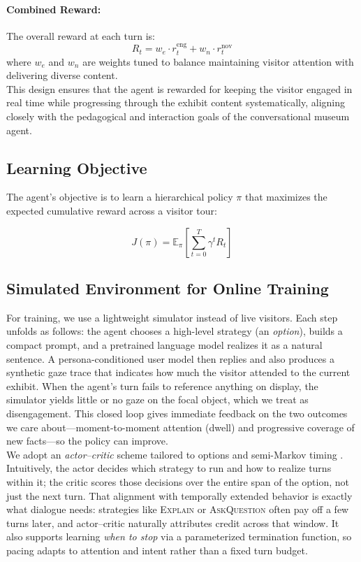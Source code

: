 \documentclass[12pt]{article}
\begin{document}
\paragraph{Combined Reward:}  
The overall reward at each turn is:
\[
R_t = w_e \cdot r^{\text{eng}}_t + w_n \cdot r^{\text{nov}}_t
\]
where $w_e$ and $w_n$ are weights tuned to balance maintaining visitor attention with delivering diverse content.\\

This design ensures that the agent is rewarded for keeping the visitor engaged in real time while progressing through the exhibit content systematically, aligning closely with the pedagogical and interaction goals of the conversational museum agent.


\subsection{Learning Objective}

The agent's objective is to learn a hierarchical policy \(\pi\) that maximizes the expected cumulative reward across a visitor tour:

\[
J(\pi) = \mathbb{E}_{\pi} \left[ \sum_{t=0}^{T} \gamma^t R_t \right]
\]

\subsection{Simulated Environment for Online Training}

For training, we use a lightweight simulator instead of live visitors. Each step unfolds as follows: the agent chooses a high-level strategy (an \emph{option}), builds a compact prompt, and a pretrained language model realizes it as a natural sentence. A persona-conditioned user model then replies and also produces a synthetic gaze trace that indicates how much the visitor attended to the current exhibit. When the agent’s turn fails to reference anything on display, the simulator yields little or no gaze on the focal object, which we treat as disengagement. This closed loop gives immediate feedback on the two outcomes we care about—moment-to-moment attention (dwell) and progressive coverage of new facts—so the policy can improve.\\

We adopt an \emph{actor--critic} scheme tailored to options and semi-Markov timing \citep{sutton1999between,bacon2017option}. Intuitively, the actor decides which strategy to run and how to realize turns within it; the critic scores those decisions over the entire span of the option, not just the next turn. That alignment with temporally extended behavior is exactly what dialogue needs: strategies like \textsc{Explain} or \textsc{AskQuestion} often pay off a few turns later, and actor--critic naturally attributes credit across that window. It also supports learning \emph{when to stop} via a parameterized termination function, so pacing adapts to attention and intent rather than a fixed turn budget.\\
\end{document}

